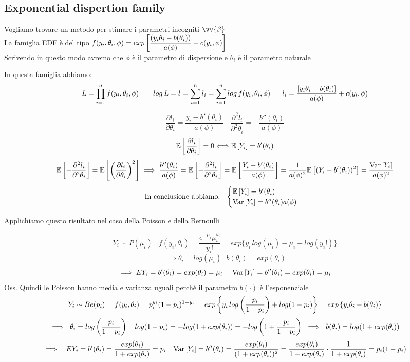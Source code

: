 \subsection{Exponential dispertion family}


Vogliamo trovare un metodo per stimare i parametri incogniti $\vv{\beta}$\\


La famiglia EDF è del tipo $f(y_i,\theta_i,\phi) = exp\left[ \dfrac{(y_i\theta_i - b(\theta_i))}{a(\phi)} + c(y_i,\phi) \right]$\\

Scrivendo in questo modo avremo che $\phi$ è il parametro di dispersione e $\theta_i$ è il parametro naturale

In questa famiglia abbiamo:
\[
L = \prod\limits_{i=1}^{n} f(y_i,\theta_i,\phi) \ \ \ \ \ \ log\, L = l = \sum\limits_{i=1}^{n} l_i = \sum\limits_{i=1}^{n} log\, f(y_i,\theta_i,\phi) \ \ \ \ \ l_i =  \dfrac{[y_i\theta_i - b(\theta_i)]}{a(\phi)} + c(y_i,\phi)
\]

\[
\frac{\partial l_i}{\partial \theta_i} = \frac{y_i - b'(\theta_i)}{a(\phi)} \ \ \ \ \frac{\partial^2 l_i}{\partial^2 \theta_i} = -\frac{b''(\theta_i)}{a(\phi)}
\]
\[
\mathbb{E} \left[ \dfrac{\partial l_i}{\partial \theta_i} \right]=0 \Longleftrightarrow \mathbb{E} \left[ Y_i \right]=b'(\theta_i)
\]
\[
\mathbb{E} \left[ -\dfrac{\partial^2 l_i}{\partial^2 \theta_i} \right] = \mathbb{E} \left[ \left(\dfrac{\partial l_i}{\partial \theta_i}\right)^2 \right] \implies \dfrac{b''(\theta_i)}{a(\phi)}=\mathbb{E} \left[ -\dfrac{\partial^2 l_i}{\partial^2 \theta_i} \right] = \mathbb{E} \left[ \dfrac{Y_i - b'(\theta_i)}{a(\phi)} \right] = \dfrac{1}{a(\phi)^2} \mathbb{E} \left[ (Y_i - b'(\theta_i))^2 \right] = \dfrac{\text{Var} \left[ Y_i \right]}{a(\phi)^2}
\]
\[
\text{In conclusione abbiamo: \ } \begin{cases}
    \mathbb{E} \left[ Y_i \right]= b'(\theta_i)\\
    \text{Var} \left[ Y_i \right] = b''(\theta_i)a(\phi)
\end{cases}
\]

\phantom{}


Applichiamo questo risultato nel caso della Poisson e della Bernoulli

\[
Y_i \sim P(\mu_i) \ \ \ \ f(y_i, \theta_i) = \frac{e^{-\mu_i}\mu_i^{y_i}}{y_i!} = exp\{y_i\, log(\mu_i) - \mu_i - log(y_i!)\}
\]
\[
\implies \theta_i=log(\mu_i) \ \ \ b(\theta_i)=exp(\theta_i)
\]
\[
\implies E{Y_i} = b'(\theta_i) = exp(\theta_i)=\mu_i \ \ \ \ \text{Var} \left[ Y_i \right] = b''(\theta_i) = exp(\theta_i)=\mu_i
\]
Oss. Quindi le Poisson hanno media e varianza uguali perché il parametro $b(\cdot)$ è l'esponenziale\\
\[
Y_i\sim Be(p_i) \ \ \ \ f(y_i, \theta_i)= p_i^{y_i} (1-p_i)^{1-y_i} = exp \left\{ y_i\, log \left(\dfrac{p_i}{1-p_i}\right) + log(1-p_i) \right\} = exp\left\{ y_i\theta_i - b(\theta_i)\right\}
\]
\[
\implies \ \theta_i= log\O\frac{p_i}{1-p_i}\C \ \ \ log(1-p_i)=-log(1+exp(\theta_i)) = -log\O 1+ \frac{p_i}{1-p_i}\C \ \implies \ b(\theta_i) = log (1+exp(\theta_i))
\]
\[
\implies  \ \ E{Y_i}= b'(\theta_i) = \dfrac{exp(\theta_i)}{1+exp(\theta_i)} = p_i \ \ \ \text{Var} \left[ Y_i \right] = b''(\theta_i) = \dfrac{exp(\theta_i)}{(1+exp(\theta_i))^2} = \dfrac{exp(\theta_i)}{1+exp(\theta_i)}\cdot \dfrac{1}{1+exp(\theta_i)} = p_i (1-p_i)
\]

